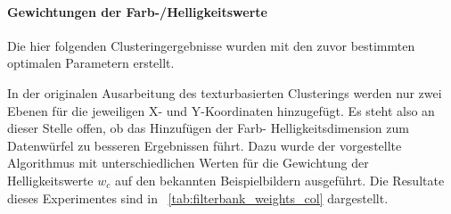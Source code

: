 \paragraph{Gewichtungen der Farb-/Helligkeitswerte}
Die hier folgenden Clusteringergebnisse wurden mit den zuvor bestimmten optimalen Parametern erstellt.

In der originalen Ausarbeitung des texturbasierten Clusterings \cite{jain_91} werden nur zwei Ebenen für die jeweiligen X- und Y-Koordinaten hinzugefügt. Es steht also an dieser Stelle offen, ob das Hinzufügen der Farb- \bzw Helligkeitsdimension zum Datenwürfel zu besseren Ergebnissen führt. Dazu wurde der vorgestellte Algorithmus mit unterschiedlichen Werten für die Gewichtung der Helligkeitswerte $w_c$ auf den bekannten Beispielbildern ausgeführt. Die Resultate dieses Experimentes sind in \tablename~\ref{tab:filterbank_weights_col} dargestellt.

